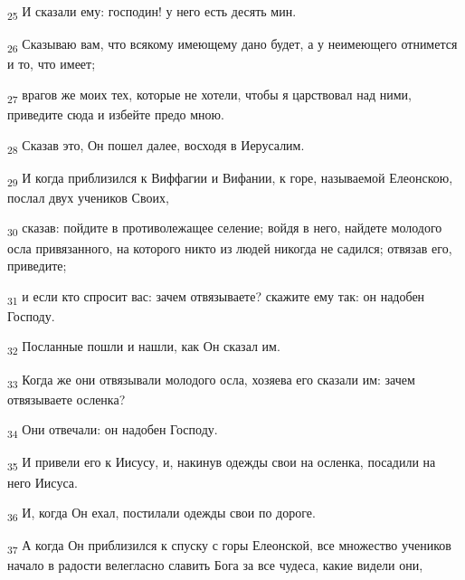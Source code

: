 \begin{tcolorbox}
\textsubscript{25} И сказали ему: господин! у него есть десять мин.
\end{tcolorbox}
\begin{tcolorbox}
\textsubscript{26} Сказываю вам, что всякому имеющему дано будет, а у неимеющего отнимется и то, что имеет;
\end{tcolorbox}
\begin{tcolorbox}
\textsubscript{27} врагов же моих тех, которые не хотели, чтобы я царствовал над ними, приведите сюда и избейте предо мною.
\end{tcolorbox}
\begin{tcolorbox}
\textsubscript{28} Сказав это, Он пошел далее, восходя в Иерусалим.
\end{tcolorbox}
\begin{tcolorbox}
\textsubscript{29} И когда приблизился к Виффагии и Вифании, к горе, называемой Елеонскою, послал двух учеников Своих,
\end{tcolorbox}
\begin{tcolorbox}
\textsubscript{30} сказав: пойдите в противолежащее селение; войдя в него, найдете молодого осла привязанного, на которого никто из людей никогда не садился; отвязав его, приведите;
\end{tcolorbox}
\begin{tcolorbox}
\textsubscript{31} и если кто спросит вас: зачем отвязываете? скажите ему так: он надобен Господу.
\end{tcolorbox}
\begin{tcolorbox}
\textsubscript{32} Посланные пошли и нашли, как Он сказал им.
\end{tcolorbox}
\begin{tcolorbox}
\textsubscript{33} Когда же они отвязывали молодого осла, хозяева его сказали им: зачем отвязываете осленка?
\end{tcolorbox}
\begin{tcolorbox}
\textsubscript{34} Они отвечали: он надобен Господу.
\end{tcolorbox}
\begin{tcolorbox}
\textsubscript{35} И привели его к Иисусу, и, накинув одежды свои на осленка, посадили на него Иисуса.
\end{tcolorbox}
\begin{tcolorbox}
\textsubscript{36} И, когда Он ехал, постилали одежды свои по дороге.
\end{tcolorbox}
\begin{tcolorbox}
\textsubscript{37} А когда Он приблизился к спуску с горы Елеонской, все множество учеников начало в радости велегласно славить Бога за все чудеса, какие видели они,
\end{tcolorbox}

